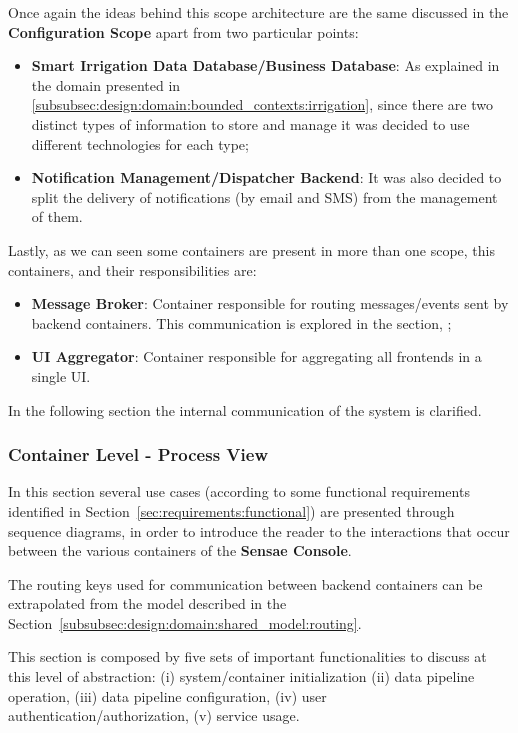 Once again the ideas behind this scope architecture are the same discussed in the \textbf{Configuration Scope} apart from two particular points:

\begin{itemize}
   \item \textbf{Smart Irrigation Data Database/Business Database}: As explained in the domain presented in \ref{subsubsec:design:domain:bounded_contexts:irrigation}, since there are two distinct types of information to store and manage it was decided to use different technologies for each type;
   \item \textbf{Notification Management/Dispatcher Backend}: It was also decided to split the delivery of notifications (by email and SMS) from the management of them. 
\end{itemize}

Lastly, as we can seen some containers are present in more than one scope, this containers, and their responsibilities are:

\begin{itemize}
   \item \textbf{Message Broker}: Container responsible for routing messages/events sent by backend containers. This communication is explored in the section, ;
   \item \textbf{UI Aggregator}: Container responsible for aggregating all frontends in a single \gls{UI}.
\end{itemize}

In the following section the internal communication of the system is clarified.

\subsubsection{Container Level - Process View}
\label{subsubsec:design:architecture:container:process}

In this section several use cases (according to some functional requirements identified in Section~\ref{sec:requirements:functional}) are presented through sequence diagrams, in order to introduce the reader to the interactions that occur between the various containers of the \textbf{Sensae Console}. 

The routing keys used for communication between backend containers can be extrapolated from the model described in the Section~\ref{subsubsec:design:domain:shared_model:routing}. 

This section is composed by five sets of important functionalities to discuss at this level of abstraction: (i) system/container initialization (ii) data pipeline operation, (iii) data pipeline configuration, (iv) user authentication/authorization, (v) service usage.

